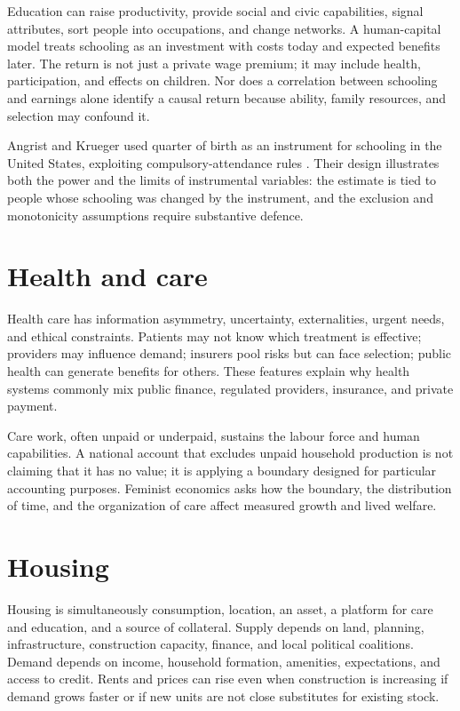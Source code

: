 \documentclass[11pt,oneside,openany]{book}
\begin{document}
Education can raise productivity, provide social and civic capabilities, signal attributes, sort people into occupations, and change networks. A human-capital model treats schooling as an investment with costs today and expected benefits later. The return is not just a private wage premium; it may include health, participation, and effects on children. Nor does a correlation between schooling and earnings alone identify a causal return because ability, family resources, and selection may confound it.

Angrist and Krueger used quarter of birth as an instrument for schooling in the United States, exploiting compulsory-attendance rules \cite{angrist1991}. Their design illustrates both the power and the limits of instrumental variables: the estimate is tied to people whose schooling was changed by the instrument, and the exclusion and monotonicity assumptions require substantive defence.

\section{Health and care}

Health care has information asymmetry, uncertainty, externalities, urgent needs, and ethical constraints. Patients may not know which treatment is effective; providers may influence demand; insurers pool risks but can face selection; public health can generate benefits for others. These features explain why health systems commonly mix public finance, regulated providers, insurance, and private payment.

Care work, often unpaid or underpaid, sustains the labour force and human capabilities. A national account that excludes unpaid household production is not claiming that it has no value; it is applying a boundary designed for particular accounting purposes. Feminist economics asks how the boundary, the distribution of time, and the organization of care affect measured growth and lived welfare.

\section{Housing}

Housing is simultaneously consumption, location, an asset, a platform for care and education, and a source of collateral. Supply depends on land, planning, infrastructure, construction capacity, finance, and local political coalitions. Demand depends on income, household formation, amenities, expectations, and access to credit. Rents and prices can rise even when construction is increasing if demand grows faster or if new units are not close substitutes for existing stock.
\end{document}
